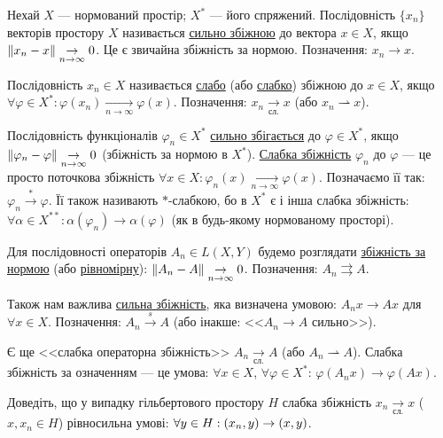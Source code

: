 
\begin{theory}
    Нехай $X$ --- нормований простір; $X^*$ --- його спряжений. Послідовність $\{x_n\}$ 
    векторів простору $X$ називається \ul{сильно збіжною} до вектора $x \in X$, якщо 
    $\left\lVert x_n - x\right\rVert \underset{n \rightarrow \infty}{\rightarrow} 0$. Це є звичайна збіжність 
    за нормою. Позначення: $x_n \rightarrow x$.

    Послідовність $x_n \in X$ називається \ul{слабо} (або \ul{слабко}) збіжною до $x \in X$, 
    якщо $\forall \varphi \in X^* : \varphi(x_n) \underset{n \rightarrow \infty}{\rightarrow} 
    \varphi(x)$. Позначення: $x_n \underset{\text{сл.}}{\rightarrow} x$ 
    (або $x_n \rightharpoonup x$).

    Послідовність функціоналів $\varphi_n \in X^*$ \ul{сильно збігається} до $\varphi \in X^*$, 
    якщо $\left\lVert\varphi_n - \varphi\right\rVert \underset{n \rightarrow \infty}{\rightarrow} 0$ 
    (збіжність за нормою в $X^*$). \ul{Слабка збіжність} $\varphi_n$ до $\varphi$ --- 
    це просто поточкова збіжність  $\forall x \in X : \varphi_n(x) \underset{n \rightarrow \infty}{\rightarrow} \varphi(x)$.
    Позначаємо її так: $\varphi_n \overset{*}{\rightarrow} \varphi$. 
    Її також називають $*$-слабкою, бо в $X^*$ є і інша слабка збіжність: $\forall \alpha 
    \in X^{**} : \alpha(\varphi_n) \rightarrow \alpha(\varphi)$ (як в будь-якому 
    нормованому просторі).

    Для послідовності операторів $A_n \in L(X, Y)$ будемо розглядати \ul{збіжність за нормою} 
    (або \ul{рівномірну}): $\left\lVert A_n - A\right\rVert \underset{n \rightarrow \infty}{\rightarrow} 0$. 
    Позначення: $A_n \rightrightarrows A$.

    Також нам важлива \ul{сильна збіжність}, яка визначена умовою: 
    $A_n x \rightarrow Ax$ для $\forall x \in X$. Позначення: $A_n \overset{s}{\rightarrow} A$ 
    (або інакше: <<$A_n \rightarrow A$ сильно>>).

    Є ще <<слабка операторна збіжність>> $A_n \underset{\text{сл.}}{\rightarrow} A$ 
    (або $A_n \rightharpoonup A$). Слабка збіжність за означенням --- це умова: 
    $\forall x \in X$, $\forall \varphi \in X^*$: $\varphi(A_nx) \rightarrow \varphi(Ax)$.
\end{theory}

\begin{exercise}
    Доведіть, що у випадку гільбертового простору $H$ слабка збіжність $x_n 
    \underset{\text{сл.}}{\rightarrow} x$ ($x, x_n \in H$) рівносильна умові: 
    $\forall y \in H : \left(x_n, y\right) \rightarrow \left(x, y\right)$.
\end{exercise}

